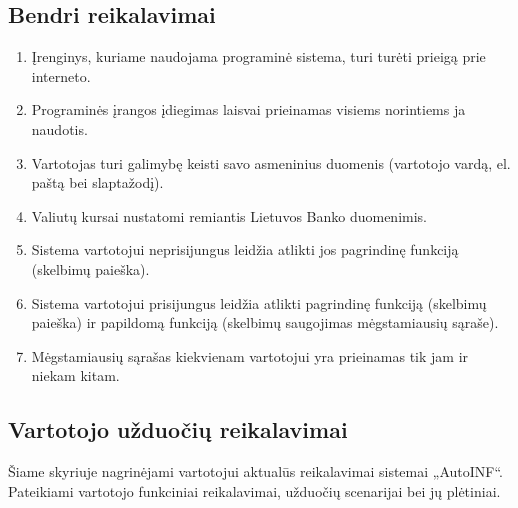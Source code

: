 \documentclass[12pt]{article}
\begin{document}
	\subsection{Bendri reikalavimai}
	\begin{enumerate}[labelindent=10pt,leftmargin=2.2cm]
		\item Įrenginys, kuriame naudojama programinė sistema, turi turėti prieigą prie interneto.
		\item Programinės įrangos įdiegimas laisvai prieinamas visiems norintiems ja naudotis.
		\item Vartotojas turi galimybę keisti savo asmeninius duomenis (vartotojo vardą, el. paštą bei slaptažodį).
		\item Valiutų kursai nustatomi remiantis Lietuvos Banko duomenimis.
		\item Sistema vartotojui neprisijungus leidžia atlikti jos pagrindinę funkciją (skelbimų paieška).
		\item Sistema vartotojui prisijungus leidžia atlikti pagrindinę funkciją (skelbimų paieška) ir papildomą funkciją (skelbimų saugojimas mėgstamiausių sąraše).
		\item Mėgstamiausių sąrašas kiekvienam vartotojui yra prieinamas tik jam ir niekam kitam.
	\end{enumerate}
	\pagebreak
	
	\renewcommand*{\theenumi}{\thesubsubsection.\arabic{enumi}}
	\renewcommand*{\theenumii}{\thesubsubsection.\theenumi.\arabic{enumii}}
	\renewcommand*{\theenumiii}{\thesubsubsection.\theenumi.\theenumii.\arabic{enumiii}}
	\subsection{Vartotojo užduočių reikalavimai}\label{Vartotojo_reikalavimai}
	Šiame skyriuje nagrinėjami vartotojui aktualūs reikalavimai sistemai „AutoINF“. Pateikiami vartotojo funkciniai reikalavimai, užduočių scenarijai bei jų plėtiniai.
	
\end{document}
